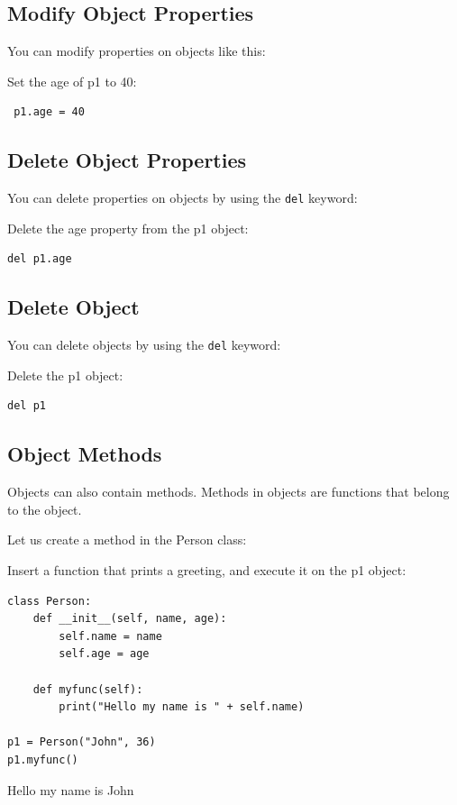 \documentclass[12pt,a4paper]{article}
\newcommand{\code}[1]{%
	\colorbox{backcolour}{\lstinline{#1}}%
}
\begin{document}
\subsection{Modify Object Properties}

You can modify properties on objects like this:

\begin{ebox}
Set the age of p1 to 40:
	\begin{lstlisting}
 p1.age = 40
	\end{lstlisting}
\end{ebox}
\subsection{Delete Object Properties}

You can delete properties on objects by using the \code{del} keyword:

\begin{ebox}
Delete the age property from the p1 object:
	\begin{lstlisting}
del p1.age
	\end{lstlisting}
\end{ebox}
\subsection{Delete Object}

You can delete objects by using the \code{del} keyword:

\begin{ebox}
Delete the p1 object:
	\begin{lstlisting}
del p1
	\end{lstlisting}
\end{ebox}
\subsection{Object Methods}\label{pyObjectMethod}

Objects can also contain methods. Methods in objects are functions that belong
to the object.

Let us create a method in the Person class:

\begin{ebox}
Insert a function that prints a greeting, and execute it on the p1 object:
	\begin{lstlisting}
class Person:
    def __init__(self, name, age):
        self.name = name
        self.age = age

    def myfunc(self):
        print("Hello my name is " + self.name)

p1 = Person("John", 36)
p1.myfunc()
	\end{lstlisting}
\tcblower
	\begin{vercode}
Hello my name is John
	\end{vercode}
\end{ebox}
\end{document}
